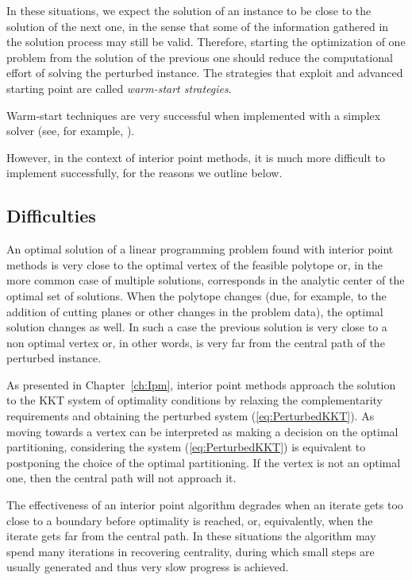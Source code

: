In these situations, we expect the solution of an instance to be 
close to the solution of the next one, in the sense that some of
the information gathered in the solution process may still be valid. 
Therefore, starting the 
optimization of one problem from the solution of the previous one
should reduce the computational effort of solving the perturbed instance.
The strategies that exploit and advanced starting point are called
{\em warm-start strategies}.

Warm-start techniques are very successful 
when implemented with a simplex solver (see, for example, 
\cite{Bixby02}). 


However, in the context of interior point methods, it 
is much more difficult to implement successfully, for the reasons
we outline below.

%
%
\subsection{Difficulties}
\label{sec:WarmStartDifficulties}

An optimal solution of a linear programming problem found with 
interior point methods is very close to the optimal vertex of 
the feasible polytope or, in the more common case of multiple solutions, 
corresponds in the analytic center of the optimal set of solutions.
When the polytope changes (due, for example,
to the addition of cutting planes or other changes in the 
problem data), the optimal solution changes as well.
In such a case the previous solution is very close to a non optimal
vertex or, in other words, is very far from the central path
of the perturbed instance. 

As presented in Chapter~\ref{ch:Ipm}, interior point methods approach 
the solution to the KKT system of optimality conditions by relaxing 
the complementarity requirements and obtaining the perturbed
system (\ref{eq:PerturbedKKT}).
As moving towards a vertex can be interpreted as making 
a decision on the optimal partitioning, considering the 
system (\ref{eq:PerturbedKKT}) is equivalent to postponing 
the choice of the optimal partitioning.
If the vertex is not an 
optimal one, then the central path will not approach it.

The effectiveness of an interior point algorithm degrades when an 
iterate gets too close to a boundary before optimality is reached,
or, equivalently, when the iterate gets far from the central path.
In these situations the algorithm may spend many iterations in recovering
centrality, during which small steps are usually generated and thus
very slow progress is achieved.

